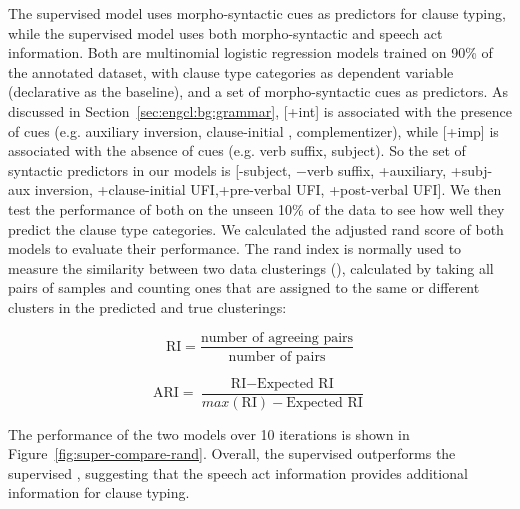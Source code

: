 The supervised \dlearnerabbr{} model uses morpho-syntactic cues as predictors for clause typing, while the supervised \plearnerabbr{} model uses both morpho-syntactic and speech act information. Both are multinomial logistic regression models trained on 90\% of the annotated dataset, with clause type categories as dependent variable (declarative as the baseline), and a set of morpho-syntactic cues as predictors. As discussed in Section~\ref{sec:engcl:bg:grammar}, [+int] is associated with the presence of cues (e.g. auxiliary inversion, clause-initial \twh{}, complementizer), while [+imp] is associated with the absence of cues (e.g. verb suffix, subject). So the set of syntactic predictors in our models is [-subject, $-$verb suffix, +auxiliary, +subj-aux inversion, +clause-initial UFI,+pre-verbal UFI, +post-verbal UFI]. We then test the performance of both on the unseen 10\% of the data to see how well they predict the clause type categories. We calculated the adjusted rand score of both models to evaluate their performance. The rand index is normally used to measure the similarity between two data clusterings (\cite{rand1971}), calculated by taking all pairs of samples and counting ones that are assigned to the same or different clusters in the predicted and true clusterings:

\begin{equation} \mbox{RI} =\frac{ \mbox{number of agreeing pairs}}{ \mbox{number of pairs}} 
\end{equation}


\begin{equation} \label{eq:ari}
\mbox{ARI} =\frac{ \mbox{RI}-\mbox{Expected RI}}{ max(\mbox{RI})-\mbox{Expected RI}} 
\end{equation}


The performance of the two models over 10 iterations is shown in Figure~\ref{fig:super-compare-rand}. Overall, the supervised \praglearner{} outperforms the supervised \distlearner{}, suggesting that the speech act information provides additional information for clause typing.


